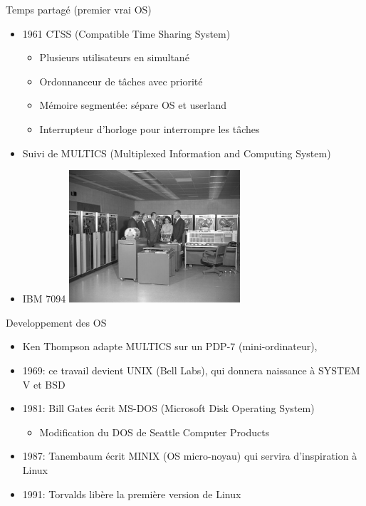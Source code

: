 \documentclass[11pt]{beamer}
\begin{document}
\begin{frame}{Temps partagé (premier vrai OS)}

\begin{itemize}
\item
  1961 CTSS (Compatible Time Sharing System)

  \begin{itemize}
  \itemsep1pt\parskip0pt
  \item
    Plusieurs utilisateurs en simultané
  \item
    Ordonnanceur de tâches avec priorité
  \item
    Mémoire segmentée: sépare OS et userland
  \item
    Interrupteur d'horloge pour interrompre les tâches
  \end{itemize}
\item
  Suivi de MULTICS (Multiplexed Information and Computing System)
\item
  IBM 7094 \centering
  \includegraphics[width=0.5\textwidth]{figs/IBM7094.jpg}
\end{itemize}

\end{frame}

\begin{frame}{Developpement des OS}

\begin{itemize}
\itemsep1pt\parskip0pt
\item
  Ken Thompson adapte MULTICS sur un PDP-7 (mini-ordinateur),
\item
  1969: ce travail devient UNIX (Bell Labs), qui donnera naissance à
  SYSTEM V et BSD
\item
  1981: Bill Gates écrit MS-DOS (Microsoft Disk Operating System)

  \begin{itemize}
  \itemsep1pt\parskip0pt
  \item
    Modification du DOS de Seattle Computer Products
  \end{itemize}
\item
  1987: Tanembaum écrit MINIX (OS micro-noyau) qui servira d'inspiration
  à Linux
\item
  1991: Torvalds libère la première version de Linux
\end{itemize}

\end{frame}
\end{document}
